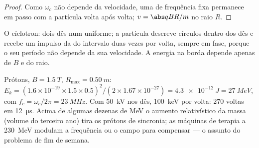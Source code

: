 \begin{proof}
Como $\omega_c$ não depende da velocidade, uma  de frequência fixa
permanece em passo com a partícula volta após volta; $v = \abs qBR/m$ no raio
$R$.
\end{proof}

\begin{omfigure}

{\small O cíclotron: dois dês num  uniforme; a
partícula descreve círculos dentro dos dês e recebe um impulso da  do intervalo duas vezes
por volta, sempre em fase, porque o seu período não depende da sua
velocidade. A energia na borda depende apenas de $B$ e do raio.}
\end{omfigure}

\begin{example}\label{ex:b1:charged-particles:medical}
Prótons, $B = \qty{1.5}{T}$, $R_{\max} = \qty{0.50}{m}$: $E_k =
(1.6\times10^{-19} \times 1.5 \times 0.5)^2/(2 \times 1.67\times10^{-27}) =
\qty{4.3e-12}{J} = \qty{27}{MeV}$, com $f_c = \omega_c/2\pi = \qty{23}{MHz}$.
Com \qty{50}{kV} nos dês, \qty{100}{keV} por volta: $270$ voltas em
\qty{12}{\micro s}. Acima de algumas dezenas de MeV o aumento relativístico
da massa (volume do terceiro ano) tira os prótons de sincronia; as máquinas de terapia
a \qty{230}{MeV} modulam a frequência ou o campo para compensar ---
o assunto do problema de fim de semana.
\end{example}

